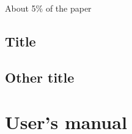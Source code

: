 \documentclass[12pt,a4paper,twoside]{report}
\begin{document}

About 5\% of the paper
\section{Title}
\section{Other title}

\chapter{User's manual}

%
%
\end{document}
